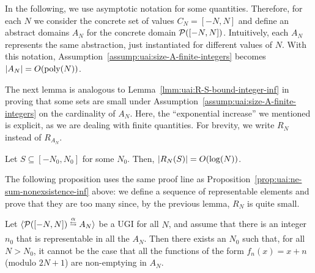 In the following, we use asymptotic notation for some quantities. Therefore, for each $N$ we consider the concrete set of values $C_N = [-N, N]$ and define an abstract domains $A_N$ for the concrete domain $\mathcal{P}([-N, N])$. Intuitively, each $A_N$ represents the same abstraction, just instantiated for different values of $N$. With this notation, Assumption~\ref{assump:uai:size-A-finite-integers} becomes $\lvert A_N\rvert = O(\text{poly}(N))$.

The next lemma is analogous to Lemma~\ref{lmm:uai:R-S-bound-integer-inf} in proving that some sets are small under Assumption~\ref{assump:uai:size-A-finite-integers} on the cardinality of $A_N$. Here, the ``exponential increase'' we mentioned is explicit, as we are dealing with finite quantities. For brevity, we write $R_N$ instead of $R_{A_N}$.
\begin{lemma}\label{lmm:uai:R-S-bound-integer-fin}
	Let $S \subseteq [-N_0, N_0]$ for some $N_0$. Then, $\lvert R_{N}(S)\rvert = O(\log(N))$.
\end{lemma}
The following proposition uses the same proof line as Proposition~\ref{prop:uai:ne-sum-nonexsistence-inf} above: we define a sequence of representable elements and prove that they are too many since, by the previous lemma, $R_N$ is quite small.
\begin{prop}\label{prop:uai:ne-sum-nonexsistence-fin}
	Let $\ugi{\pow([-N, N])}{\alpha}{A_N}$ be a UGI for all $N$, and assume that there is an integer $n_0$ that is representable in all the $A_N$. Then there exists an $N_0$ such that, for all $N > N_0$, it cannot be the case that all the functions of the form $f_n(x) = x + n$ (modulo $2N + 1$) are non-emptying in $A_N$.
\end{prop}
